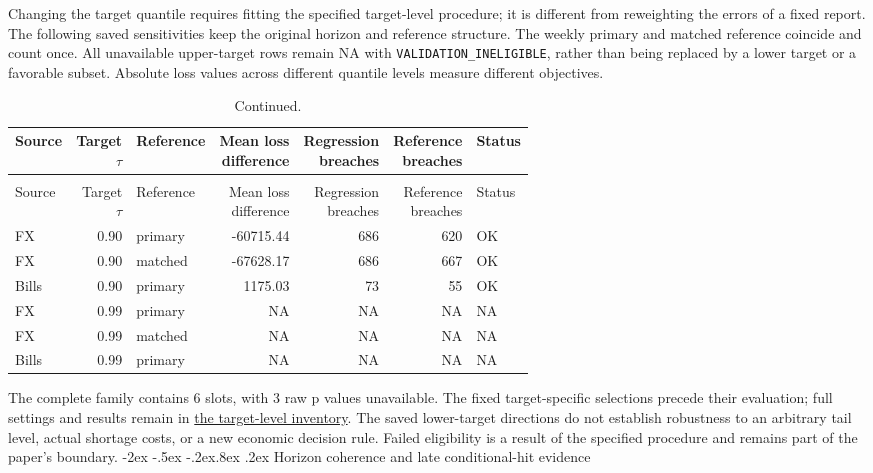 \documentclass[10pt,a4paper]{article}
\makeatletter
\renewcommand\section{\@startsection{section}{1}{\z@}%
  {-2ex \@plus -.5ex \@minus -.2ex}{.8ex \@plus .2ex}%
  {\normalfont\large\bfseries}}
\makeatother
\begin{document}
Changing the target quantile requires fitting the specified target-level procedure; it is different from reweighting the errors of a fixed report.
The following saved sensitivities keep the original horizon and reference
structure. The weekly primary and matched reference coincide and count once.
All unavailable upper-target rows remain NA with
\texttt{VALIDATION\_INELIGIBLE}, rather than being replaced by a lower target
or a favorable subset. Absolute loss values across different quantile levels
measure different objectives.
\begingroup
\footnotesize
\setlength{\tabcolsep}{3pt}
\renewcommand{\arraystretch}{1.12}
\begin{longtable}{lrp{20mm}rrrl}
\caption{Complete target-level sensitivity. The lower-target directions recur, but upper-target evidence remains unavailable.}\\
\toprule
Source & \shortstack{Target\\\(\tau\)} & Reference & \shortstack{Mean loss\\difference} & \shortstack{Regression\\breaches} & \shortstack{Reference\\breaches} & Status \\
\midrule
\endfirsthead
\caption[]{Continued.}\\
\toprule
Source & \shortstack{Target\\\(\tau\)} & Reference & \shortstack{Mean loss\\difference} & \shortstack{Regression\\breaches} & \shortstack{Reference\\breaches} & Status \\
\midrule
\endhead
\bottomrule
\endfoot
FX & 0.90 & primary & -60715.44 & 686 & 620 & OK \\
FX & 0.90 & matched & -67628.17 & 686 & 667 & OK \\
Bills & 0.90 & primary & 1175.03 & 73 & 55 & OK \\
FX & 0.99 & primary & NA & NA & NA & NA \\
FX & 0.99 & matched & NA & NA & NA & NA \\
Bills & 0.99 & primary & NA & NA & NA & NA \\
\end{longtable}
\endgroup

The complete family contains 6 slots,
with 3 raw p values unavailable.
The fixed target-specific selections precede their evaluation; full settings
and results remain in \href{https://github.com/ByronLi0207/financial-mathematics-paper-20261020/blob/revision-v7-final/results/revision-20261023/v6/wp5-tau-summary.json}{the target-level inventory}.
The saved lower-target directions do not establish robustness to an arbitrary
tail level, actual shortage costs, or a new economic decision rule. Failed
eligibility is a result of the specified procedure and remains part of the
paper's boundary.\section{Horizon coherence and late conditional-hit evidence}\label{sup:coherence}
\end{document}
